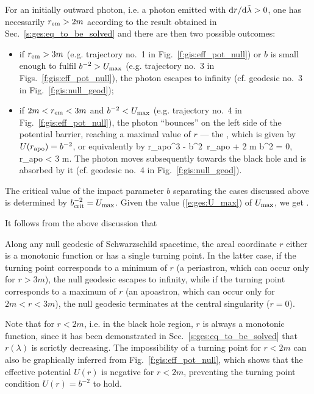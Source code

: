 For an initially outward photon, i.e. a photon emitted with ${\mathrm{d} r}/{\mathrm{d}\tilde{\lambda}} > 0$,
one has necessarily $r_{\rm em}>2m$ according to the result obtained in Sec.~\ref{s:ges:eq_to_be_solved}
and there are then two possible outcomes:

\begin{itemize}
\item if $r_{\rm em} > 3 m$ (e.g. trajectory
no.~1 in Fig.~\ref{f:gis:eff_pot_null}) or
$b$ is small enough to fulfil $b^{-2} > U_{\rm max}$ (e.g. trajectory
no.~3 in Figs.~\ref{f:gis:eff_pot_null}), the photon escapes to infinity
(cf. geodesic no.~3 in Fig.~\ref{f:gis:null_geod});
\item if $2m < r_{\rm em} < 3 m$ and $b^{-2} < U_{\rm max}$ (e.g. trajectory
no.~4 in Fig.~\ref{f:gis:eff_pot_null}), the photon ``bounces'' on the left
side of the potential barrier, reaching a maximal value of $r$
--- the ,
which is given by  $U(r_{\rm apo}) = b^{-2}$, or equivalently by
\be \label{e:ges:r_apo_null}
   r_{\rm apo}^3 - b^2\, r_{\rm apo} + 2 m b^2 = 0, \quad r_{\rm apo} < 3 m.
\ee
The photon moves subsequently towards the black hole and
is absorbed by it (cf. geodesic no.~4 in Fig.~\ref{f:gis:null_geod}).
\end{itemize}

The critical value of the impact parameter $b$ separating the cases discussed
above is determined by $b_{\rm crit}^{-2} = U_{\rm max}$.
Given the value (\ref{e:ges:U_max}) of $U_{\rm max}$, we get
\be \label{e:ges:b_crit}
    .
\ee

It follows from the above discussion that
\begin{greybox}
Along any null geodesic of Schwarzschild spacetime, the areal coordinate $r$
either is a monotonic function or has a single turning point. In the latter case,
if the turning point corresponds to a minimum of $r$ (a periastron, which can occur
only for $r>3m$), the null geodesic escapes to infinity, while if the turning
point corresponds to a maximum of $r$ (an apoastron, which can occur only for $2m<r<3m$), the
null geodesic terminates at the central singularity ($r=0$).
\end{greybox}
Note that for $r<2m$, i.e. in the black hole region, $r$
is always a monotonic function, since it has been demonstrated in
Sec.~\ref{s:ges:eq_to_be_solved} that $r(\lambda)$ is scrictly
decreasing. The impossibility of a turning point for $r<2m$ can also be
graphically inferred from Fig.~\ref{f:gis:eff_pot_null}, which shows
that the effective potential $U(r)$ is negative for $r<2m$,
preventing the turning point condition $U(r) = b^{-2}$ to hold.


